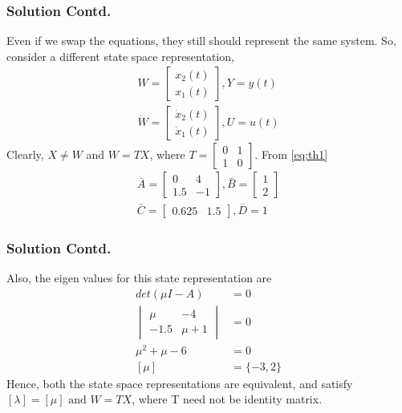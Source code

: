 \documentclass{beamer}
\begin{document}
\begin{frame}
\frametitle{Solution Contd.}
Even if we swap the equations, they still should represent the same system. So, consider a different state space representation, 
\begin{align}
    W=\begin{bmatrix}
    x_2(t)\\x_1(t)
    \end{bmatrix},Y=y(t)\\
    \dot W=\begin{bmatrix}
    \dot x_2(t)\\\dot x_1(t)
    \end{bmatrix},U=u(t)
\end{align}
Clearly, $X\neq W$ and $W=TX$, where $T=\begin{bmatrix}
0 & 1\\
1 & 0
\end{bmatrix}$. From \eqref{eq:th1}
\begin{align}
    \bar A=\begin{bmatrix}
    0 & 4\\
    1.5 & -1
    \end{bmatrix},\bar B=\begin{bmatrix}
    1\\
    2
    \end{bmatrix}\\
    \bar C=\begin{bmatrix}
    0.625 & 1.5
    \end{bmatrix},\bar D=1
\end{align}
\end{frame}

\begin{frame}
\frametitle{Solution Contd.}
Also, the eigen values for this state representation are
\begin{align}
    det(\mu I-A)&=0\\
    \begin{vmatrix}
    \mu & -4\\
    -1.5 & \mu+1
    \end{vmatrix}&=0\\
    \mu^2+\mu-6&=0\\
    [\mu]&=\{-3,2\}
\end{align}
Hence, both the state space representations are equivalent, and satisfy $[\lambda]=[\mu] \text{ and } W=TX$, where T need not be identity matrix.
\end{frame}
\end{document}
